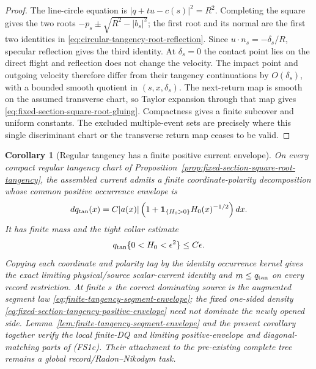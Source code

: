 \documentclass[11pt]{article}
\newtheorem{corollary}[theorem]{Corollary}
\newcommand{\one}{\mathbf 1}
\begin{document}
\begin{proof}
The line-circle equation is
$|q+tu-c(s)|^2=R^2$.  Completing the square gives the two roots
$-p_s\pm\sqrt{R^2-|b_s|^2}$; the first root and its normal are the first two
identities in \eqref{eq:circular-tangency-root-reflection}.  Since
$u\cdot n_s=-\delta_s/R$, specular reflection gives the third identity.
At $\delta_s=0$ the contact point lies on the direct flight and reflection
does not change the velocity.  The impact point and outgoing velocity
therefore differ from their tangency continuations by $O(\delta_s)$, with a
bounded smooth quotient in $(s,x,\delta_s)$.  The next-return map is smooth
on the assumed transverse chart, so Taylor expansion through that map gives
\eqref{eq:fixed-section-square-root-gluing}.  Compactness gives a finite
subcover and uniform constants.  The excluded multiple-event sets are
precisely where this single discriminant chart or the transverse return map
ceases to be valid.
\end{proof}

\begin{corollary}[Regular tangency has a finite positive current envelope]
\label{cor:fixed-section-tangency-positive-envelope}
On every compact regular tangency chart of
Proposition~\ref{prop:fixed-section-square-root-tangency}, the assembled
current admits a finite coordinate-polarity decomposition whose common
positive occurrence envelope is
\begin{equation}
\label{eq:fixed-section-tangency-positive-envelope}
 dq_{\rm tan}(x)=C|a(x)|
 \left(1+\one_{\{H_0>0\}}H_0(x)^{-1/2}\right)dx.
\end{equation}
It has finite mass and the tight collar estimate
\begin{equation}
\label{eq:fixed-section-tangency-envelope-tightness}
 q_{\rm tan}\{0<H_0<\epsilon^2\}\le C\epsilon.
\end{equation}
Copying each coordinate and polarity tag by the identity occurrence kernel
gives the exact limiting physical/source scalar-current identity and
$m\le q_{\rm tan}$ on every record restriction.  At finite $s$ the correct
dominating source is the augmented segment law
\eqref{eq:finite-tangency-segment-envelope}; the fixed one-sided density
\eqref{eq:fixed-section-tangency-positive-envelope} need not dominate the
newly opened side.  Lemma~\ref{lem:finite-tangency-segment-envelope} and
the present corollary together verify the local finite-DQ and limiting
positive-envelope and diagonal-matching parts of \textup{(FS1c)}.  Their
attachment to the pre-existing complete tree remains a global
record/Radon--Nikodym task.
\end{corollary}
\end{document}
